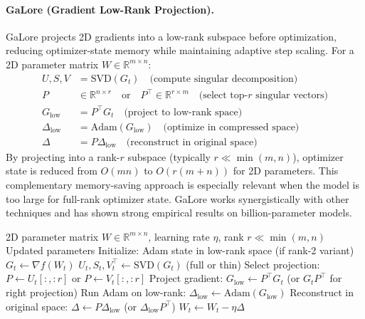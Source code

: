 \documentclass[11pt,a4paper]{article}
\begin{document}
\paragraph{GaLore (Gradient Low-Rank Projection).}
GaLore projects 2D gradients into a low-rank subspace before optimization, reducing optimizer-state memory while maintaining adaptive step scaling. For a 2D parameter matrix $W \in \mathbb{R}^{m \times n}$:
\begin{align}
U, S, V &= \text{SVD}(G_t) \quad\text{(compute singular decomposition)} \\
P &\in \mathbb{R}^{n \times r} \quad\text{or} \quad P^\top \in \mathbb{R}^{r \times m} \quad\text{(select top-$r$ singular vectors)} \\
G_{\text{low}} &= P^\top G_t \quad\text{(project to low-rank space)} \\
\Delta_{\text{low}} &= \text{Adam}(G_{\text{low}}) \quad\text{(optimize in compressed space)} \\
\Delta &= P \Delta_{\text{low}} \quad\text{(reconstruct in original space)}
\end{align}
By projecting into a rank-$r$ subspace (typically $r \ll \min(m,n)$), optimizer state is reduced from $O(mn)$ to $O(r(m+n))$ for 2D parameters. This complementary memory-saving approach is especially relevant when the model is too large for full-rank optimizer state. GaLore works synergistically with other techniques and has shown strong empirical results on billion-parameter models.

\begin{algorithm}[H]
\caption{GaLore (Gradient Low-Rank Projection)}
\label{alg:galore}
\begin{algorithmic}[1]
\Require 2D parameter matrix $W \in \mathbb{R}^{m \times n}$, learning rate $\eta$, rank $r \ll \min(m,n)$
\Ensure Updated parameters
\State Initialize: Adam state in low-rank space (if rank-2 variant)
    \State $G_t \gets \nabla f(W_t)$
      
        \State $U_t, S_t, V_t^\top \gets \text{SVD}(G_t)$ (full or thin)
        \State Select projection: $P \gets U_t[:, :r]$ or $P \gets V_t[:, :r]$
    \EndIf
    \State Project gradient: $G_{\text{low}} \gets P^\top G_t$ (or $G_t P^\top$ for right projection)
    \State Run Adam on low-rank: $\Delta_{\text{low}} \gets \text{Adam}(G_{\text{low}})$
    \State Reconstruct in original space: $\Delta \gets P \Delta_{\text{low}}$ (or $\Delta_{\text{low}} P^\top$)
    \State $W_t \gets W_t - \eta \Delta$
\EndFor
\end{algorithmic}
\end{algorithm}
\end{document}
